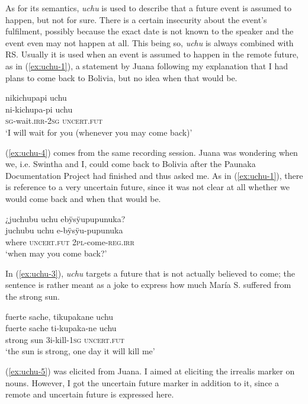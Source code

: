 As for its semantics, \textit{uchu} is used to describe that a future event is assumed to happen, but not for sure. There is a certain insecurity about the event’s fulfilment, possibly because the exact date is not known to the speaker and the event even may not happen at all. This being so, \textit{uchu} is always combined with  RS. Usually it is used when an event is assumed to happen in the remote future, as in (\ref{ex:uchu-1}), a statement by Juana following my explanation that I had plans to come back to Bolivia, but no idea when that would be.

\ea\label{ex:uchu-1}
\begingl
\glpreamble nikichupapi uchu\\
\gla ni-kichupa-pi uchu\\
\textsc{sg}-wait.\textsc{irr}-2\textsc{sg} \textsc{uncert.fut}\\
\glft ‘I will wait for you (whenever you may come back)’
\endgl
\trailingcitation{[jxx-p120430l-1.471]}
\xe

(\ref{ex:uchu-4}) comes from the same recording session. Juana was wondering when we, i.e. Swintha and I, could come back to Bolivia after the Paunaka Documentation Project had finished and thus asked me. As in (\ref{ex:uchu-1}), there is reference to a very uncertain future, since it was not clear at all whether we would come back and when that would be.

\ea\label{ex:uchu-4}
\begingl
\glpreamble ¿juchubu uchu ebÿsÿupupunuka?\\
\gla juchubu uchu e-bÿsÿu-pupunuka\\
\glb where \textsc{uncert.fut} 2\textsc{pl}-come-\textsc{reg.irr}\\
\glft ‘when may you come back?’
\endgl
\trailingcitation{[jxx-p120430l-1.133]}
\xe

In (\ref{ex:uchu-3}), \textit{uchu} targets a future that is not actually believed to come; the sentence is rather meant as a joke to express how much María S. suffered from the strong sun.

\ea\label{ex:uchu-3}
\begingl
\glpreamble fuerte sache, tikupakane uchu\\
\gla fuerte sache ti-kupaka-ne uchu\\
\glb strong sun 3i-kill-1\textsc{sg} \textsc{uncert.fut}\\
\glft ‘the sun is strong, one day it will kill me’
\endgl
\trailingcitation{[rmx-e150922l.005-006]}
\xe

(\ref{ex:uchu-5}) was elicited from Juana. I aimed at eliciting the irrealis marker on nouns. However, I got the uncertain future marker in addition to it, since a remote and uncertain future is expressed here.

